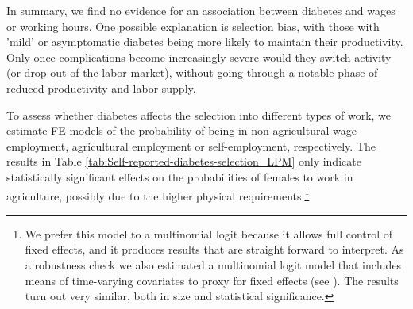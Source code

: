 \documentclass[12pt,english]{article}
\begin{document}
In summary, we find no evidence for an association between diabetes and wages or working hours. One possible explanation is selection bias, with those with 'mild' or asymptomatic diabetes being more likely to maintain their productivity. Only once complications become increasingly severe would they switch activity (or drop out of the labor market), without going through a notable phase of reduced productivity and labor supply.

To assess whether diabetes affects the selection into different types of work, we estimate \ac{FE} models of the probability of being in non-agricultural wage employment, agricultural employment or self-employment, respectively. The results in Table \ref{tab:Self-reported-diabetes-selection_LPM} only indicate statistically significant effects on the probabilities of females to work in agriculture, possibly due to the higher physical requirements.\footnote{We prefer this model to a multinomial logit because it allows full control of fixed effects, and it produces results that are straight forward to interpret. As a robustness check we also estimated a multinomial logit model that includes means of time-varying covariates to proxy for fixed effects (see \textcite{Mundlak1978,Bell2015}). The results turn out very similar, both in size and statistical significance.}
\end{document}

